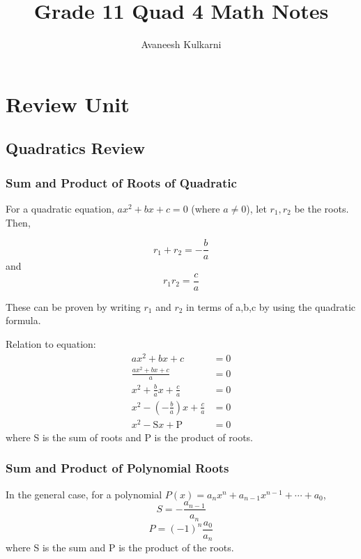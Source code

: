 \documentclass{article}
\title{Grade 11 Quad 4 Math Notes}
\author{Avaneesh Kulkarni}
\date{}
\numberwithin{equation}{section}
\begin{document}
\maketitle
\tableofcontents
\newpage
{}

\section{Review Unit}

\subsection{Quadratics Review}

\subsubsection*{Sum and Product of Roots of Quadratic}
For a quadratic equation, $ax^2 + bx + c = 0$ (where $a \neq 0$),
let $r_1, r_2$ be the roots. Then,

\begin{equation}\label{sumquad}
	r_1 + r_2 = -\frac{b}{a}
\end{equation}
and
\begin{equation}\label{prodquad}
	r_1 r_2 = \frac{c}{a}
\end{equation}

These can be proven by writing $r_1$ and $r_2$ in terms of a,b,c by using the quadratic formula.

Relation to equation:
\begin{align*}
	ax^2 + bx + c &= 0 \\ 
	\frac{ax^2 + bx + c}{a} &= 0 \\ 
	x^2 + \frac{b}{a}x + \frac{c}{a} &= 0 \\ 
	x^2 - \left( - \frac{b}{a} \right) x + \frac{c}{a} &= 0 \\ 
	x^2 - \mathrm{S} x + \mathrm{P} &= 0 
\end{align*}
where S is the sum of roots and P is the product of roots.

\subsubsection*{Sum and Product of Polynomial Roots}
In the general case, for a polynomial $P(x) = a_nx^n + a_{n-1}x^{n-1} + \dotsb + a_0 $,
\begin{equation}
	S = - \frac{a_{n-1}}{a_n}
\end{equation}
\begin{equation}
	P = (-1)^n \frac{a_0}{a_n}
\end{equation}
where S is the sum and P is the product of the roots.
\end{document}
